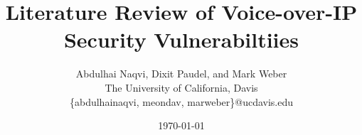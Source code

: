 \documentclass[letterpaper,twocolumn,10pt]{article}
\begin{document}
\title{ Literature Review of Voice-over-IP Security Vulnerabiltiies}
  \date{ \today }
  \author{Abdulhai Naqvi, Dixit Paudel, and Mark Weber\\
  The University of California, Davis\\
  \{abdulhainaqvi, meondav, marweber\}@ucdavis.edu}

\maketitle






\appendix


\end{document}

